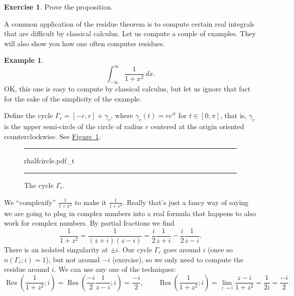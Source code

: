 \documentclass[12pt,openany]{book}
\theoremstyle{plain}
\theoremstyle{remark}
\theoremstyle{definition}
\newenvironment{exbox}{%
    \def\FrameCommand{\vrule width 1pt \relax\hspace{10pt}}%
    \MakeFramed{\advance\hsize-\width\FrameRestore}%
}{%
    \endMakeFramed
}
\newenvironment{myfig}{%
\begin{figure}[h!t]
\noindent\rule{\textwidth}{0.4pt}\vspace{12pt}\par\centering}%
{\par\noindent\rule{\textwidth}{0.4pt}
\end{figure}}
\theoremstyle{exercise}
\newtheorem{exercise}{Exercise}[section]
\theoremstyle{example}
\newtheorem{example}[thm]{Example}
\newcommand{\figureref}[1]{\hyperref[#1]{Figure~\ref*{#1}}}
\begin{document}
\begin{exbox}
\begin{exercise}
Prove the proposition.
\end{exercise}
\end{exbox}

A common application of the residue theorem is to compute certain real
integrals that are difficult by classical calculus.  Let us compute
a couple of examples.  They will also show you how one often computes
residues.

\begin{example}
\begin{equation*}
\int_{-\infty}^\infty \frac{1}{1+x^2} \, dx .
\end{equation*}
OK, this one is easy to compute by classical calculus, but let us ignore
that fact for the sake of the simplicity of the example.

Define the cycle $\Gamma_r = [-r,r] + \gamma_r$, where $\gamma_r(t) =
re^{it}$ for $t \in [0,\pi]$, that is, $\gamma_r$ is the upper semi-circle
of the circle of radius $r$ centered at the origin oriented counterclockwise.
See \figureref{fig:rhalfcircle}.

\begin{myfig}
{rhalfcircle.pdf_t}
\caption{The cycle $\Gamma_r$.\label{fig:rhalfcircle}}
\end{myfig}

We ``complexify''
$\frac{1}{1+x^2}$ to make it $\frac{1}{1+z^2}$.  Really
that's just a fancy way of saying we are going to plug in complex numbers
into a real formula that happens to also work for complex numbers.
By partial fractions we find
\begin{equation*}
\frac{1}{1+z^2} = \frac{1}{(z+i)(z-i)} =
\frac{i}{2} \frac{1}{z+i} - 
\frac{i}{2} \frac{1}{z-i} .
\end{equation*}
There is an isolated singularity at $\pm i$.  Our cycle
$\Gamma_r$ goes around $i$ (once so $n(\Gamma_r;i) = 1$),
but not around $-i$ (exercise), so we only need to compute
the residue around $i$.  We can use any one of the techniques:
\begin{equation*}
\operatorname{Res}\left(\frac{1}{1+z^2};i\right) =
\operatorname{Res}\left(
\frac{-i}{2} \frac{1}{z-i};
i\right) = \frac{-i}{2} ,
\qquad
\operatorname{Res}\left(\frac{1}{1+z^2};i\right) =
\lim_{z \to i} \frac{z-i}{1+z^2}
=
\frac{1}{2i} = \frac{-i}{2}.
\end{equation*}


\end{example}
\end{document}
